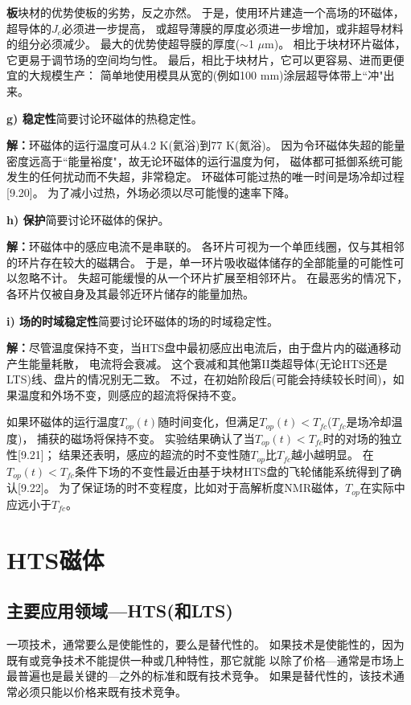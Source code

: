 \textbf{板}\qquad 块材的优势使板的劣势，反之亦然。
于是，使用环片建造一个高场的环磁体，超导体的$J_c$必须进一步提高，
或超导薄膜的厚度必须进一步增加，或非超导材料的组分必须减少。
最大的优势使超导膜的厚度($\sim$1 $\mu$m)。
相比于块材环片磁体，它更易于调节场的空间均匀性。
最后，相比于块材片，它可以更容易、进而更便宜的大规模生产：
简单地使用模具从宽的(例如100 mm)涂层超导体带上``冲"出来。


\textbf{g) 稳定性}\qquad 简要讨论环磁体的热稳定性。

\textbf{解：}环磁体的运行温度可从4.2 K(氦浴)到77 K(氮浴)。
因为令环磁体失超的能量密度远高于``能量裕度"，故无论环磁体的运行温度为何，
磁体都可抵御系统可能发生的任何扰动而不失超，非常稳定。
环磁体可能过热的唯一时间是场冷却过程[9.20]。
为了减小过热，外场必须以尽可能慢的速率下降。

\textbf{h) 保护}\qquad 简要讨论环磁体的保护。

\textbf{解：}环磁体中的感应电流不是串联的。
各环片可视为一个单匝线圈，仅与其相邻的环片存在较大的磁耦合。
于是，单一环片吸收磁体储存的全部能量的可能性可以忽略不计。
失超可能缓慢的从一个环片扩展至相邻环片。
在最恶劣的情况下，各环片仅被自身及其最邻近环片储存的能量加热。

\textbf{i) 场的时域稳定性}\qquad 简要讨论环磁体的场的时域稳定性。

\textbf{解：}尽管温度保持不变，当HTS盘中最初感应出电流后，由于盘片内的磁通移动产生能量耗散，
电流将会衰减。
这个衰减和其他第II类超导体(无论HTS还是LTS)线、盘片的情况别无二致。
不过，在初始阶段后(可能会持续较长时间)，如果温度和外场不变，则感应的超流将保持不变。

如果环磁体的运行温度$T_{op}(t)$随时间变化，但满足$T_{op}(t)<T_{fc}$($T_{fc}$是场冷却温度)，
捕获的磁场将保持不变。
实验结果确认了当$T_{op}(t)<T_{fc}$时的对场的独立性[9.21]；
结果还表明，感应的超流的时不变性随$T_{op}$比$T_{fc}$越小越明显。
在$T_{op}(t)<T_{fc}$条件下场的不变性最近由基于块材HTS盘的飞轮储能系统得到了确认[9.22]。
为了保证场的时不变程度，比如对于高解析度NMR磁体，$T_{op}$在实际中应远小于$T_{fc}$。

\section{HTS磁体}
\subsection{主要应用领域---HTS(和LTS)}
一项技术，通常要么是使能性的，要么是替代性的。
如果技术是使能性的，因为既有或竞争技术不能提供一种或几种特性，那它就能
以除了价格---通常是市场上最普遍也是最关键的---之外的标准和既有技术竞争。
如果是替代性的，该技术通常必须只能以价格来既有技术竞争。

